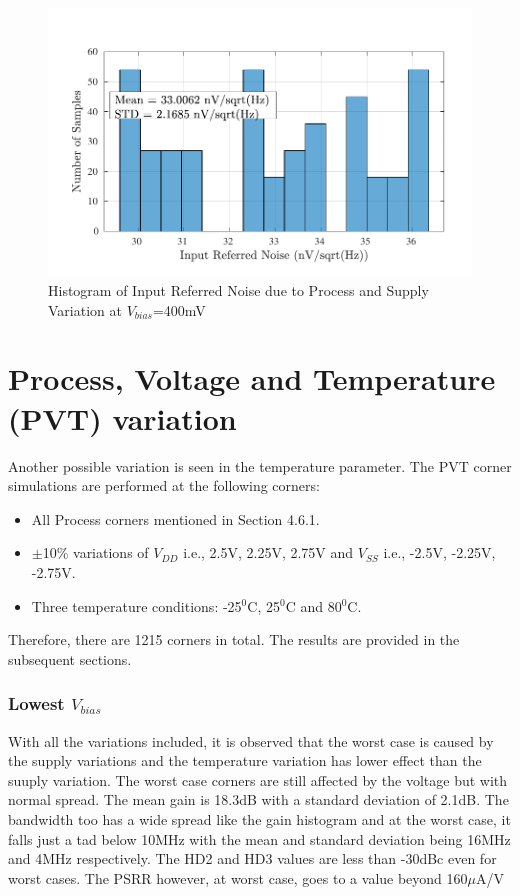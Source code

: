 \begin{figure} [H]
\centering
\includegraphics[scale=1]{Figures/Corners/Overall/PV_Max/PDFs/PV_Max_irn.pdf}
\caption{Histogram of Input Referred Noise due to Process and Supply Variation at $V_{bias}$=400mV}
\end{figure}

\section{Process, Voltage and Temperature (PVT) variation}

Another possible variation is seen in the temperature parameter. The PVT corner simulations are performed at the following corners:
\begin{itemize}
\item All Process corners mentioned in Section 4.6.1.
\item $\pm$10\% variations of $V_{DD}$ i.e., 2.5V, 2.25V, 2.75V and $V_{SS}$ i.e., -2.5V, -2.25V, -2.75V.
\item Three temperature conditions: -25$^0$C, 25$^0$C and 80$^0$C.
\end{itemize}

Therefore, there are 1215 corners in total. The results are provided in the subsequent sections.

\subsubsection{Lowest $V_{bias}$}
With all the variations included, it is observed that the worst case is caused by the supply variations and the temperature variation has lower effect than the suuply variation. The worst case corners are still affected by the voltage but with normal spread. The mean gain is 18.3dB with a standard deviation of 2.1dB. The bandwidth too has a wide spread like the gain histogram and at the worst case, it falls just a tad below 10MHz with the mean and standard deviation being 16MHz and 4MHz respectively. The HD2 and HD3 values are less than -30dBc even for worst cases. The PSRR however, at worst case, goes to a value beyond 160$\mu$A/V

